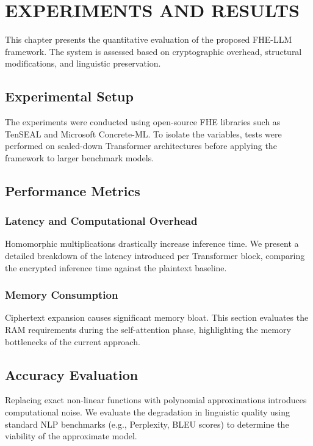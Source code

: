 \chapter{EXPERIMENTS AND RESULTS}

This chapter presents the quantitative evaluation of the proposed FHE-LLM framework. The system is assessed based on cryptographic overhead, structural modifications, and linguistic preservation.

\section{Experimental Setup}
The experiments were conducted using open-source FHE libraries such as TenSEAL and Microsoft Concrete-ML. To isolate the variables, tests were performed on scaled-down Transformer architectures before applying the framework to larger benchmark models.

\section{Performance Metrics}
\subsection{Latency and Computational Overhead}
Homomorphic multiplications drastically increase inference time. We present a detailed breakdown of the latency introduced per Transformer block, comparing the encrypted inference time against the plaintext baseline.

\subsection{Memory Consumption}
Ciphertext expansion causes significant memory bloat. This section evaluates the RAM requirements during the self-attention phase, highlighting the memory bottlenecks of the current approach.

\section{Accuracy Evaluation}
Replacing exact non-linear functions with polynomial approximations introduces computational noise. We evaluate the degradation in linguistic quality using standard NLP benchmarks (e.g., Perplexity, BLEU scores) to determine the viability of the approximate model.